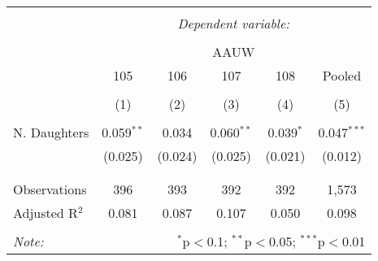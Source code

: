 
\begin{table}[!htbp] \centering 
  \caption{} 
  \label{} 
\small 
\begin{tabular}{@{\extracolsep{5pt}}lccccc} 
\\[-1.8ex]\hline 
\hline \\[-1.8ex] 
 & \multicolumn{5}{c}{\textit{Dependent variable:}} \\ 
\cline{2-6} 
\\[-1.8ex] & \multicolumn{5}{c}{AAUW} \\ 
 & 105 & 106 & 107 & 108 & Pooled \\ 
\\[-1.8ex] & (1) & (2) & (3) & (4) & (5)\\ 
\hline \\[-1.8ex] 
 N. Daughters & 0.059$^{**}$ & 0.034 & 0.060$^{**}$ & 0.039$^{*}$ & 0.047$^{***}$ \\ 
  & (0.025) & (0.024) & (0.025) & (0.021) & (0.012) \\ 
  & & & & & \\ 
\hline \\[-1.8ex] 
Observations & 396 & 393 & 392 & 392 & 1,573 \\ 
Adjusted R$^{2}$ & 0.081 & 0.087 & 0.107 & 0.050 & 0.098 \\ 
\hline 
\hline \\[-1.8ex] 
\textit{Note:}  & \multicolumn{5}{r}{$^{*}$p$<$0.1; $^{**}$p$<$0.05; $^{***}$p$<$0.01} \\ 
\end{tabular} 
\end{table} 

